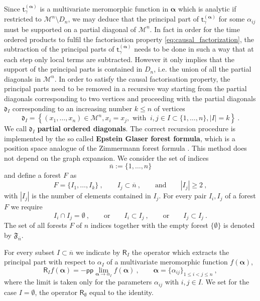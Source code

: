 \documentclass[11pt]{book}
\newcommand{\pp}{\mathsf{pp}}
\newcommand{\alphabd}{\boldsymbol{\alpha}}
\newcommand{\abs}[1]{\left|#1\right|}
\newcommand{\Mcal}{\mathcal{M}}
\newcommand{\drak}{\mathfrak{d}}
\newcommand{\Rsf}{\mathsf{R}}
\newcommand{\tsf}{\mathsf{t}}
\theoremstyle{break}
\begin{document}
Since $\tsf^{(\alphabd)}_\gamma$ is a multivariate meromorphic function in $\alphabd$  which is analytic if restricted to $\Mcal^n\setminus D_n$, we may deduce that the principal part of $\tsf^{(\alphabd)}_\gamma$ for some $\alpha_{ij}$ must be supported on a partial diagonal of $\Mcal^n$. In fact in order for the time ordered products to fulfil the factorisation property \eqref{eq:causal_factorization}, the subtraction of the principal parts of $\tsf^{(\alphabd)}_\gamma$ needs to be done in such a way that at each step only local terms are subtracted. However it only implies that the support of the principal parts is contained in $D_n$, i.e. the union of all the partial diagonals in $\Mcal^n$. In order to satisfy the causal factorisation property, the principal parts need to be removed in a recursive way starting from the partial diagonals corresponding to two vertices and proceeding with the partial diagonals $\drak_{I}$ corresponding to an increasing number $k \leq n$ of vertices 
%
\begin{equation*}
\drak_{I} = \left\{ (x_1,\dots, x_n) \in \Mcal^n, x_i=x_j, \mbox{ with } \ i,j \in I\subset \{1,\dots, n\} , \abs{I} = k \right\} \ . 
\end{equation*}
%
We call $\drak_{I}$ \textbf{partial ordered diagonals}. The correct recursion procedure is implemented by the so called \textbf{Epstein Glaser forest formula}, which is a position space analogue of the Zimmermann forest formula \cite{duetsch_dimensional_2014}. This method does not depend on the graph expansion. We consider the set of indices 
\begin{equation*}
\overline{n} := \{1,\dots , n\} 
\end{equation*}
and define a forest $F$ as 
%
\begin{equation*}
F = \{ I_1,\dots, I_k\} \ , \qquad I_j \subset \overline{n} \ , \qquad \mbox{and} \qquad \abs{I_j} \geq 2 \ ,
\end{equation*}
%
with $\abs{I_j}$ is the number of elements contained in $I_j$. For every pair $I_i,I_j$ of a forest $F$ we require
%
\begin{equation*}
I_i\cap I_j = \emptyset \ , \qquad \text{or} \qquad I_i \subset I_j \ , \qquad \mbox{or} \qquad  I_j\subset I_j \ .
\end{equation*}
%
The set of all forests $F$ of $n$ indices together with the empty forest $\{\emptyset\}$ is denoted by $\mathfrak{F}_{\overline{n}}$.


For every subset $I\subset \overline{n}$ we indicate by $\Rsf_I$ the operator which extracts the principal part with respect to $\alpha_I$ of a multivariate meromorphic function $f(\alphabd)$, 
%
\begin{equation}
\Rsf_I f(\alphabd) = - \pp  \lim_{\alphabd \to \alpha_I} f(\alphabd) \ ,
\qquad \alphabd = \{\alpha_{ij}\}_{1\leq i<j \leq n} \ , 
\label{eq:pp_op}
\end{equation}
\index{$\Rsf_I $}
%
where the limit is taken only for the parameters $\alpha_{ij}$ with $i,j \in I$. We set for the case $I=\emptyset$, the operator $\Rsf_\emptyset$ equal to the identity.
\end{document}
